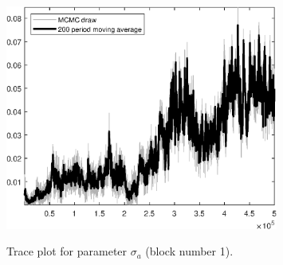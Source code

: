 \begin{figure}[H]
\centering
  \includegraphics[width=0.8\textwidth]{BRS_growth_ext_shopping/graphs/TracePlot_sigma_a_blck_1}\\
    \caption{Trace plot for parameter ${\sigma_a}$ (block number 1).}
\end{figure}
